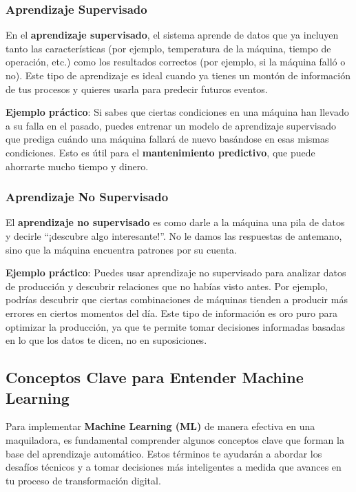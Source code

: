 \subsubsection{\textbf{Aprendizaje Supervisado}}\label{aprendizaje-supervisado-1}

En el \textbf{aprendizaje supervisado}, el sistema aprende de datos que ya incluyen tanto las características (por ejemplo, temperatura de la máquina, tiempo de operación, etc.) como los resultados correctos (por ejemplo, si la máquina falló o no). Este tipo de aprendizaje es ideal cuando ya tienes un montón de información de tus procesos y quieres usarla para predecir futuros eventos.

\textbf{Ejemplo práctico}: Si sabes que ciertas condiciones en una máquina han llevado a su falla en el pasado, puedes entrenar un modelo de aprendizaje supervisado que prediga cuándo una máquina fallará de nuevo basándose en esas mismas condiciones. Esto es útil para el \textbf{mantenimiento predictivo}, que puede ahorrarte mucho tiempo y dinero.

\subsubsection{\textbf{Aprendizaje No Supervisado}}\label{aprendizaje-no-supervisado-1}

El \textbf{aprendizaje no supervisado} es como darle a la máquina una pila de datos y decirle ``¡descubre algo interesante!''. No le damos las respuestas de antemano, sino que la máquina encuentra patrones por su cuenta.

\textbf{Ejemplo práctico}: Puedes usar aprendizaje no supervisado para analizar datos de producción y descubrir relaciones que no habías visto antes. Por ejemplo, podrías descubrir que ciertas combinaciones de máquinas tienden a producir más errores en ciertos momentos del día. Este tipo de información es oro puro para optimizar la producción, ya que te permite tomar decisiones informadas basadas en lo que los datos te dicen, no en suposiciones.

\subsection{Conceptos Clave para Entender Machine Learning}\label{conceptos-clave-para-entender-machine-learning}

Para implementar \textbf{Machine Learning (ML)} de manera efectiva en una maquiladora, es fundamental comprender algunos conceptos clave que forman la base del aprendizaje automático. Estos términos te ayudarán a abordar los desafíos técnicos y a tomar decisiones más inteligentes a medida que avances en tu proceso de transformación digital.


